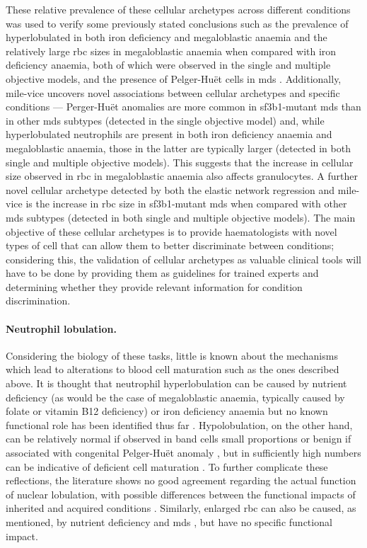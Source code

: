 These relative prevalence of these cellular archetypes across different conditions was used to verify some previously stated conclusions such as the prevalence of hyperlobulated in both iron deficiency and megaloblastic anaemia \cite{Lindenbaum1980-ux,Westerman1999-gs} and the relatively large \ac{rbc} sizes in megaloblastic anaemia when compared with iron deficiency anaemia, both of which were observed in the single and multiple objective models, and the presence of Pelger-Huët cells in \ac{mds} \cite{Colella2012-so}. Additionally, \ac{mile-vice} uncovers novel associations between cellular archetypes and specific conditions --- Perger-Huët anomalies are more common in \ac{sf3b1}-mutant \ac{mds} than in other \ac{mds} subtypes (detected in the single objective model) and, while hyperlobulated neutrophils are present in both iron deficiency anaemia and megaloblastic anaemia, those in the latter are typically larger (detected in both single and multiple objective models). This suggests that the increase in cellular size observed in \ac{rbc} in megaloblastic anaemia also affects granulocytes. A further novel cellular archetype detected by both the elastic network regression and \ac{mile-vice} is the increase in \ac{rbc} size in \ac{sf3b1}-mutant \ac{mds} when compared with other \ac{mds} subtypes (detected in both single and multiple objective models). The main objective of these cellular archetypes is to provide haematologists with novel types of cell that can allow them to better discriminate between conditions; considering this, the validation of cellular archetypes as valuable clinical tools will have to be done by providing them as guidelines for trained experts and determining whether they provide relevant information for condition discrimination.

\paragraph{Neutrophil lobulation.} Considering the biology of these tasks, little is known about the mechanisms which lead to alterations to blood cell maturation such as the ones described above. It is thought that neutrophil hyperlobulation can be caused by nutrient deficiency (as would be the case of megaloblastic anaemia, typically caused by folate or vitamin B12 deficiency) or iron deficiency anaemia but no known functional role has been identified thus far \cite{Manley2018-xo}. Hypolobulation, on the other hand, can be relatively normal if observed in band cells small proportions or benign if associated with congenital Pelger-Huët anomaly \cite{Colella2012-so}, but in sufficiently high numbers can be indicative of deficient cell maturation \cite{Aster2020-cu}. To further complicate these reflections, the literature shows no good agreement regarding the actual function of nuclear lobulation, with possible differences between the functional impacts of inherited and acquired conditions \cite{Manley2018-xo}. Similarly, enlarged \ac{rbc} can also be caused, as mentioned, by nutrient deficiency and \ac{mds} \cite{Aslinia2006-en}, but have no specific functional impact. 

